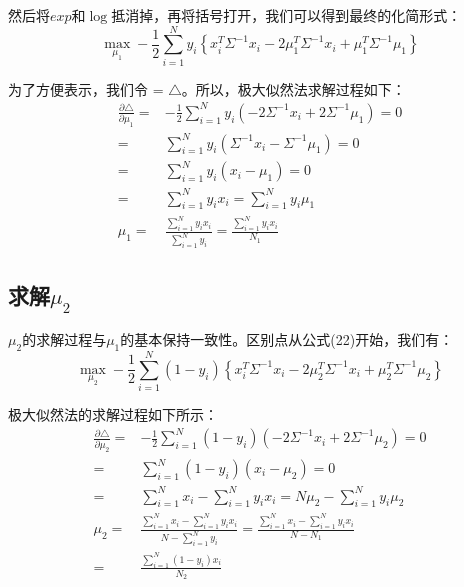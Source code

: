 \documentclass[a4paper]{article}
\begin{document}
然后将$exp$和$\log$抵消掉，再将括号打开，我们可以得到最终的化简形式：
\begin{equation}
     \max_{\mu_1} -\frac{1}{2}\sum_{i=1}^Ny_i\left\{ x_i^T\Sigma^{-1}x_i - 2\mu_1^T\Sigma^{-1}x_i + \mu_1^T\Sigma^{-1}\mu_1\right\}
\end{equation}

为了方便表示，我们令 = $\triangle$。所以，极大似然法求解过程如下：
\begin{equation}
    \begin{split}
        \frac{\partial \triangle}{\partial \mu_1} = & -\frac{1}{2}\sum_{i=1}^N y_i(- 2\Sigma^{-1}x_i + 2\Sigma^{-1}\mu_1) = 0 \\
        = & \sum_{i=1}^N y_i( \Sigma^{-1}x_i - \Sigma^{-1}\mu_1) = 0 \\
        = & \sum_{i=1}^N y_i( x_i - \mu_1) = 0 \\
        = & \sum_{i=1}^N y_i x_i = \sum_{i=1}^N y_i \mu_1  \\
        \mu_1 = & \frac{\sum_{i=1}^N y_i x_i}{\sum_{i=1}^N y_i} = \frac{\sum_{i=1}^N y_i x_i}{N_1}
    \end{split}
\end{equation}

\subsection{求解$\mu_2$}
$\mu_2$的求解过程与$\mu_1$的基本保持一致性。区别点从公式(22)开始，我们有：
\begin{equation}
    \max_{\mu_2}-\frac{1}{2}\sum_{i=1}^N(1-y_i)\left\{ x_i^T\Sigma^{-1}x_i - 2\mu_2^T\Sigma^{-1}x_i + \mu_2^T\Sigma^{-1}\mu_2\right\}
\end{equation}

极大似然法的求解过程如下所示：
\begin{equation}
    \begin{split}
        \frac{\partial \triangle}{\partial \mu_2} = & -\frac{1}{2}\sum_{i=1}^N (1-y_i)(- 2\Sigma^{-1}x_i + 2\Sigma^{-1}\mu_2) = 0 \\
        = & \sum_{i=1}^N (1-y_i)( x_i - \mu_2) = 0 \\
        = & \sum_{i=1}^N x_i - \sum_{i=1}^N y_ix_i  =  N\mu_2  - \sum_{i=1}^N y_i\mu_2\\
        \mu_2 = & \frac{\sum_{i=1}^N x_i - \sum_{i=1}^N y_ix_i}{N - \sum_{i=1}^N y_i} = \frac{\sum_{i=1}^N x_i - \sum_{i=1}^N y_ix_i}{N - N_1}\\
        = & \frac{\sum_{i=1}^N(1-y_i)x_i}{N_2}
    \end{split}
\end{equation}
\end{document}
